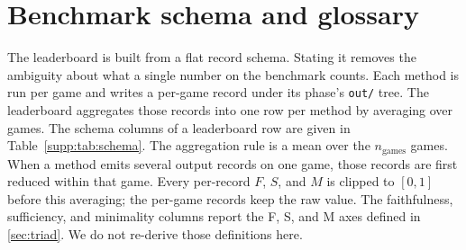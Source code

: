 \section{Benchmark schema and glossary}\label{supp:schema}

The leaderboard is built from a flat record schema. Stating it removes the ambiguity
about what a single number on the benchmark counts. Each method is run per game and writes a
per-game record under its phase's \texttt{out/} tree. The leaderboard aggregates those
records into one row per method by averaging over games. The schema columns of a leaderboard
row are given in Table~\ref{supp:tab:schema}. The aggregation rule is a mean over the
$n_{\text{games}}$ games. When a method emits several output records on one game, those records
are first reduced within that game. Every per-record $F$, $S$, and $M$ is clipped to $[0,1]$
before this averaging; the per-game records keep the raw value. The faithfulness, sufficiency, and minimality columns
report the F, S, and M axes defined in \Sectionname\ref{sec:triad}. We do not re-derive those definitions here.


